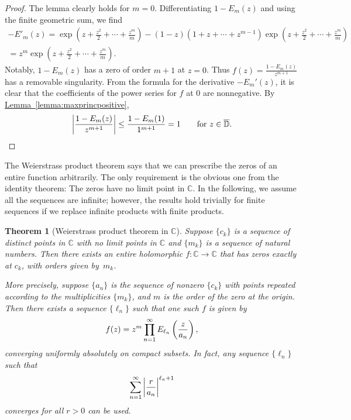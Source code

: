 \documentclass[12pt,openany]{book}
\newcommand{\avoidbreak}{\postdisplaypenalty=100}
\newcommand{\abs}[1]{\left\lvert {#1} \right\rvert}
\newcommand{\C}{{\mathbb{C}}}
\newcommand{\D}{{\mathbb{D}}}
\theoremstyle{plain}
\newtheorem{thm}{Theorem}[section]
\theoremstyle{remark}
\theoremstyle{definition}
\theoremstyle{exercise}
\theoremstyle{example}
\newcommand{\lemmaref}[1]{\hyperref[#1]{Lemma~\ref*{#1}}}
\begin{document}
\begin{proof}
The lemma clearly holds for $m=0$.
Differentiating $1-E_m(z)$ and using the finite geometric sum, we find
\begin{multline*}
-E'_m(z) =
\exp\left( z +\frac{z^2}{2} + \cdots + \frac{z^m}{m} \right)
-
(1-z) (1 +z  + \cdots + z^{m-1} ) \exp\left( z +\frac{z^2}{2} + \cdots + \frac{z^m}{m} \right)
\\
=
z^m \exp\left( z +\frac{z^2}{2} + \cdots + \frac{z^m}{m} \right) .
\end{multline*}
Notably, $1-E_m(z)$ has a zero of order $m+1$ at $z=0$.  Thus $f(z) =
\frac{1-E_m(z)}{z^{m+1}}$ has a removable singularity.  From the formula for
the derivative $-E_m'(z)$, it is clear that the coefficients of the power series
for $f$ at $0$ are nonnegative.  By \lemmaref{lemma:maxprincpositive},
\begin{equation*}
\abs{\frac{1-E_m(z)}{z^{m+1}}} \leq
\frac{1-E_m(1)}{1^{m+1}} = 1
\qquad \text{for $z \in \overline{\D}$}.  \qedhere
\end{equation*}
\end{proof}

The Weierstrass product theorem says that
we can prescribe the zeros of an entire function arbitrarily.
The only requirement is the obvious one from the identity theorem:
The zeros have no limit point in $\C$.
In the following, we assume all the sequences are infinite; however,
the results hold trivially for finite sequences if we replace infinite
products with finite products.

\begin{thm}[Weierstrass product theorem in $\C$]
\index{Weierstrass product theorem in $\C$}
\pagebreak[3]
Suppose $\{ c_k \}$ is a sequence of distinct points in $\C$
with no limit points in $\C$ and $\{ m_k \}$ is a sequence of
natural numbers.
Then there exists an entire holomorphic $f \colon \C \to \C$ that
has zeros exactly at $c_k$, with orders given by~$m_k$.

More precisely, suppose $\{ a_n \}$ is the sequence of nonzero $\{ c_k \}$ with points
repeated according to the multiplicities $\{ m_k \}$,
and $m$ is the order of the zero at the origin.
Then there exists a
sequence $\{ \ell_n \}$ such that one such $f$ is given by
\begin{equation*}
f(z) = z^m \prod_{n=1}^\infty E_{\ell_n}\left(\frac{z}{a_n}\right) ,
\avoidbreak
\end{equation*}
converging uniformly absolutely on compact subsets.
In fact, any sequence $\{ \ell_n \}$ such that
\begin{equation} \label{eq:pnconvergence}
\sum_{n=1}^\infty {\abs{\frac{r}{a_n}}}^{\ell_n+1}
\avoidbreak
\end{equation}
converges for all $r > 0$ can be used.
\end{thm}
\end{document}

